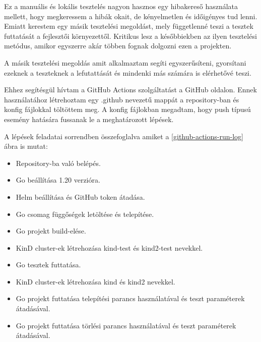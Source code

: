 Ez a manuális és lokális tesztelés nagyon hasznos egy hibakereső használata mellett, hogy megkeressem a hibák okait, de kényelmetlen és időigényes tud lenni.
Emiatt kerestem egy másik tesztelési megoldást, mely függetlenné teszi a tesztek futtatását a fejlesztői környezettől.
Kritikus lesz a későbbiekben az ilyen tesztelési metódus, amikor egyszerre akár többen fognak dolgozni ezen a projekten.

A másik tesztelési megoldás amit alkalmaztam segíti egyszerűsíteni, gyorsítani ezeknek a teszteknek a lefutattását és mindenki más számára is elérhetővé teszi. 

Ehhez segítésgül hívtam a GitHub Actions szolgáltatást a GitHub oldalon.
Ennek használatához létrehoztam egy .github nevezetű mappát a repository-ban és konfig fájlokkal töltöttem meg.
A konfig fájlokban megadtam, hogy push típusú esemény hatására fussanak le a meghatározott lépések.

\newpage

A lépések feladatai sorrendben összefoglalva amiket a \ref{github-actions-run-log} ábra is mutat:
\begin{itemize}
  \item Repository-ba való belépés.
  \item Go beállítása 1.20 verzióra.
  \item Helm beállítása és GitHub token átadása.
  \item Go csomag függőségek letöltése és telepítése.
  \item Go projekt build-elése.
  \item KinD cluster-ek létrehozása kind-test és kind2-test nevekkel.
  \item Go tesztek futtatása.
  \item KinD cluster-ek létrehozása kind és kind2 nevekkel.
  \item Go projekt futtatása telepítési parancs használatával és teszt paraméterek átadásával.
  \item Go projekt futtatása törlési parancs használatával és teszt paraméterek átadásával.
\end{itemize} 

